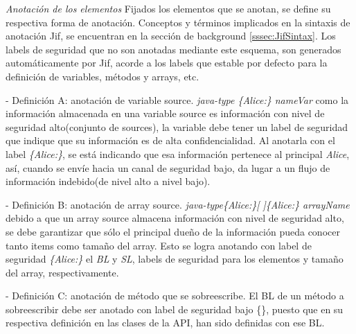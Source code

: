 \textit{Anotación de los elementos}\newline
Fijados los elementos que se anotan, se define su respectiva forma de anotación.
Conceptos y términos implicados en la sintaxis de anotación Jif, se
encuentran en la sección de background \ref{sssec:JifSintax}.
Los labels de seguridad que no son anotadas mediante este esquema, son generados
automáticamente por Jif, acorde a los labels que estable por defecto para la
definición de variables, métodos y arrays, etc.

- Definición A: anotación de variable source.\newline 
\emph{java-type \{Alice:\} nameVar}\newline
como la información almacenada en una variable source es información con nivel
de seguridad alto(conjunto de sources), la variable debe tener un label de
seguridad que indique que su información es de alta confidencialidad. Al
anotarla con el label \emph{\{Alice:\}}, se está indicando que esa información
pertenece al principal \emph{Alice}, así, cuando se envíe hacia un canal
de seguridad bajo, da lugar a un flujo de información indebido(de nivel alto a
nivel bajo).

- Definición B: anotación de array source.\newline
\emph{java-type\{Alice:\}[ ]\{Alice:\} arrayName}\newline
debido a que un array source almacena información con nivel de seguridad alto,
se debe garantizar que sólo el principal dueño de la información pueda
conocer tanto items como tamaño del array. Esto se logra anotando con
label de seguridad \emph{\{Alice:\}} el \emph{BL} y \emph{SL}, labels de
seguridad para los elementos y tamaño del array, respectivamente.

- Definición C: anotación de método que se sobreescribe.\newline
El BL de un método a sobreescribir debe ser anotado con label de seguridad bajo
\{\}, puesto que en su respectiva definición en las clases de la API, han sido
definidas con ese BL.

